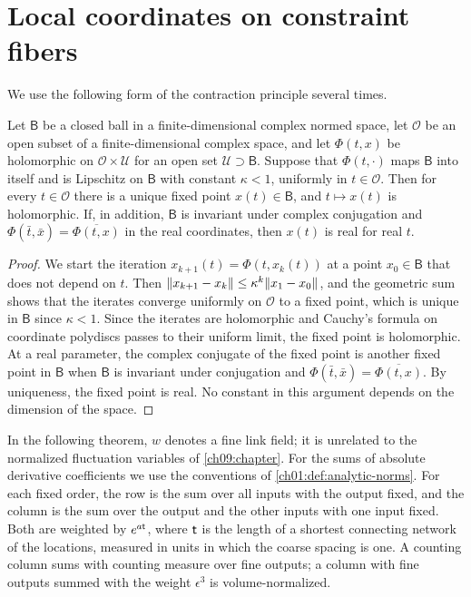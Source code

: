 \section{Local coordinates on constraint fibers}\label{ch06:sec:fiber}

We use the following form of the contraction principle several times.

\begin{lemma}\label{ch06:lem:analytic-contraction}
Let $\mathsf B$ be a closed ball in a finite-dimensional complex normed space, let $\mathcal O$ be an open subset of a finite-dimensional complex space, and let $\Phi(t,x)$ be holomorphic on $\mathcal O\times\mathcal U$ for an open set $\mathcal U\supset\mathsf B$. Suppose that $\Phi(t,\cdot)$ maps $\mathsf B$ into itself and is Lipschitz on $\mathsf B$ with constant $\kappa<1$, uniformly in $t\in\mathcal O$. Then for every $t\in\mathcal O$ there is a unique fixed point $x(t)\in\mathsf B$, and $t\mapsto x(t)$ is holomorphic. If, in addition, $\mathsf B$ is invariant under complex conjugation and $\Phi(\bar t,\bar x)=\overline{\Phi(t,x)}$ in the real coordinates, then $x(t)$ is real for real $t$.
\end{lemma}

\begin{proof}
We start the iteration $x_{k+1}(t)=\Phi(t,x_k(t))$ at a point $x_0\in\mathsf B$ that does not depend on $t$. Then $\lVert x_{k+1}-x_k\rVert\le\kappa^k\lVert x_1-x_0\rVert$, and the geometric sum shows that the iterates converge uniformly on $\mathcal O$ to a fixed point, which is unique in $\mathsf B$ since $\kappa<1$. Since the iterates are holomorphic and Cauchy's formula on coordinate polydiscs passes to their uniform limit, the fixed point is holomorphic. At a real parameter, the complex conjugate of the fixed point is another fixed point in $\mathsf B$ when $\mathsf B$ is invariant under conjugation and $\Phi(\bar t,\bar x)=\overline{\Phi(t,x)}$. By uniqueness, the fixed point is real. No constant in this argument depends on the dimension of the space.
\end{proof}

In the following theorem, $w$ denotes a fine link field; it is unrelated to the normalized fluctuation variables of \cref{ch09:chapter}. For the sums of absolute derivative coefficients we use the conventions of \cref{ch01:def:analytic-norms}. For each fixed order, the row is the sum over all inputs with the output fixed, and the column is the sum over the output and the other inputs with one input fixed. Both are weighted by $e^{a\mathsf t}$, where $\mathsf t$ is the length of a shortest connecting network of the locations, measured in units in which the coarse spacing is one. A counting column sums with counting measure over fine outputs; a column with fine outputs summed with the weight $\epsilon^3$ is volume-normalized.

